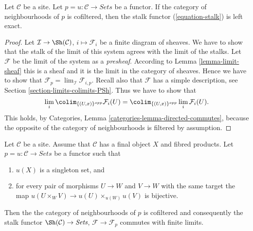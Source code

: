 \begin{lemma}
\label{lemma-neighbourhoods-cofiltered}
Let $\mathcal{C}$ be a site. Let $p = u : \mathcal{C} \to \textit{Sets}$
be a functor. If the category of neighbourhoods of $p$ is
cofiltered, then the stalk functor (\ref{equation-stalk})
is left exact.
\end{lemma}

\begin{proof}
Let $\mathcal{I} \to \Sh(\mathcal{C})$,
$i \mapsto \mathcal{F}_i$ be a finite diagram of sheaves.
We have to show that the stalk of the limit of this
system agrees with the limit of the stalks.
Let $\mathcal{F}$ be the limit of the system as a {\it presheaf}.
According to Lemma \ref{lemma-limit-sheaf} this is a sheaf and
it is the limit in the category of sheaves.
Hence we have to show that
$\mathcal{F}_p = \lim_\mathcal{I} \mathcal{F}_{i, p}$.
Recall also that $\mathcal{F}$ has a simple description, see
Section \ref{section-limits-colimits-PSh}. Thus we have to show that
$$
\lim_i \colim_{\{(U, x)\}^{opp}} \mathcal{F}_i(U)
=
\colim_{\{(U, x)\}^{opp}} \lim_i \mathcal{F}_i(U).
$$
This holds, by Categories, Lemma \ref{categories-lemma-directed-commutes},
because the opposite of the category of neighbourhoods is filtered
by assumption.
\end{proof}

\begin{lemma}
\label{lemma-neighbourhoods-directed}
Let $\mathcal{C}$ be a site. Assume that $\mathcal{C}$ has
a final object $X$ and fibred products.
Let $p = u : \mathcal{C} \to \textit{Sets}$ be a functor such that
\begin{enumerate}
\item $u(X)$ is a singleton set, and
\item for every pair of morphisms $U \to W$ and $V \to W$ with
the same target the map
$u(U \times_W V) \to u(U) \times_{u(W)} u(V)$ is bijective.
\end{enumerate}
Then the the category of neighbourhoods of $p$ is cofiltered
and consequently the stalk functor $\Sh(\mathcal{C}) \to \textit{Sets}$,
$\mathcal{F} \to \mathcal{F}_p$ commutes with finite limits.
\end{lemma}

